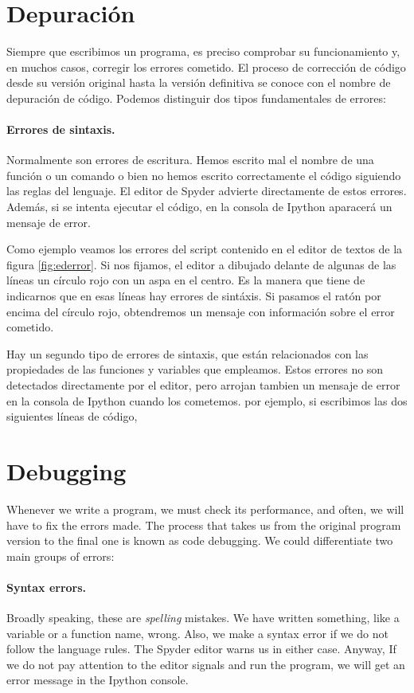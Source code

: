 \begin{paracol}{2}
\section{Depuración}
Siempre que escribimos un programa, es preciso comprobar su funcionamiento y, en  muchos casos, corregir los errores cometido. El proceso de corrección de código desde su versión original hasta la versión definitiva se conoce con el nombre de depuración de código. Podemos distinguir dos tipos fundamentales de errores:

\paragraph{Errores de sintaxis.} Normalmente son errores de escritura. Hemos escrito mal el nombre de una función o un comando o bien no hemos escrito correctamente el código siguiendo las reglas del lenguaje. El editor de Spyder advierte directamente de estos errores. Además, si se intenta ejecutar el código, en la consola de Ipython aparacerá un mensaje de error. 

Como ejemplo veamos los errores del script contenido  en el editor de textos de la figura \ref{fig:ederror}. Si nos fijamos, el editor a dibujado delante de algunas de las líneas un círculo rojo con un aspa en el centro. Es la manera que tiene de indicarnos que en esas líneas hay errores de sintáxis. Si pasamos el ratón por encima del círculo rojo, obtendremos un mensaje con información sobre el error cometido.

Hay un segundo tipo de errores de sintaxis, que están relacionados con las propiedades de las funciones y variables que empleamos. Estos errores no son detectados directamente por el editor, pero arrojan tambien un mensaje de error en la consola de Ipython cuando los cometemos. por ejemplo, si escribimos las dos siguientes líneas de código,
\switchcolumn
\section{Debugging}
Whenever we write a program, we must check its performance, and often, we will have to fix the errors made. The process that takes us from the original program version to the final one is known as code debugging. We could differentiate two main groups of errors:

\paragraph{Syntax errors.} Broadly speaking, these are \emph{spelling} mistakes. We have written something, like a variable or a function name, wrong. Also, we make a syntax error if we do not follow the language rules. The Spyder editor warns us in either case. Anyway, If we do not pay attention to the editor signals and run the program, we will get an error message in the Ipython console. 


\end{paracol}
